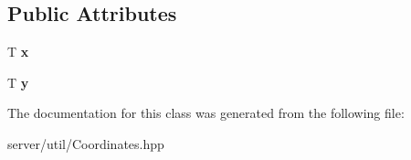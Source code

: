 \subsection*{Public Attributes}
\begin{DoxyCompactItemize}
\item 
\hypertarget{classutil_1_1_coordinates_a1052fd5dd7584f76f76d37f3d8eefb95}{T {\bfseries x}}\label{classutil_1_1_coordinates_a1052fd5dd7584f76f76d37f3d8eefb95}

\item 
\hypertarget{classutil_1_1_coordinates_aa8b56c87c71e25e6282dfaeee3516cb7}{T {\bfseries y}}\label{classutil_1_1_coordinates_aa8b56c87c71e25e6282dfaeee3516cb7}

\end{DoxyCompactItemize}


The documentation for this class was generated from the following file\-:\begin{DoxyCompactItemize}
\item 
server/util/Coordinates.\-hpp\end{DoxyCompactItemize}

